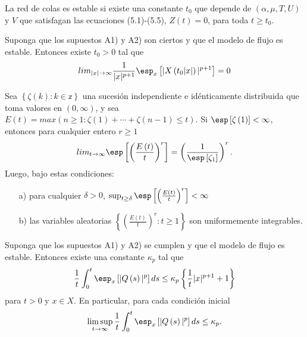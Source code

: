 \begin{Teo}\label{Tma.5.1.Chen}
La red de colas es estable si existe una constante $t_{0}$ que
depende de $\left(\alpha,\mu,T,U\right)$ y $V$ que satisfagan las
ecuaciones (5.1)-(5.5), $Z\left(t\right)=0$, para toda $t\geq
t_{0}$.
\end{Teo}

\begin{Prop}\label{Prop.5.1.DaiSean}
Suponga que los supuestos A1) y A2) son ciertos y que el modelo de flujo es estable. Entonces existe $t_{0}>0$ tal que
\begin{equation}
lim_{|x|\rightarrow\infty}\frac{1}{|x|^{p+1}}\esp_{x}\left[|X\left(t_{0}|x|\right)|^{p+1}\right]=0
\end{equation}
\end{Prop}

\begin{Lemma}\label{Lema.5.2.DaiSean}
 Sea $\left\{\zeta\left(k\right):k\in \mathbb{z}\right\}$ una sucesi\'on independiente e id\'enticamente distribuida que toma valores en $\left(0,\infty\right)$,
y sea
$E\left(t\right)=max\left(n\geq1:\zeta\left(1\right)+\cdots+\zeta\left(n-1\right)\leq
t\right)$. Si $\esp\left[\zeta\left(1\right)\right]<\infty$,
entonces para cualquier entero $r\geq1$
\begin{equation}
 lim_{t\rightarrow\infty}\esp\left[\left(\frac{E\left(t\right)}{t}\right)^{r}\right]=\left(\frac{1}{\esp\left[\zeta_{1}\right]}\right)^{r}.
\end{equation}
Luego, bajo estas condiciones:
\begin{itemize}
 \item[a)] para cualquier $\delta>0$, $\sup_{t\geq\delta}\esp\left[\left(\frac{E\left(t\right)}{t}\right)^{r}\right]<\infty$
\item[b)] las variables aleatorias
$\left\{\left(\frac{E\left(t\right)}{t}\right)^{r}:t\geq1\right\}$
son uniformemente integrables.
\end{itemize}
\end{Lemma}

\begin{Teo}\label{Tma.5.5.DaiSean}
Suponga que los supuestos A1) y A2) se cumplen y que el modelo de
flujo es estable. Entonces existe una constante $\kappa_{p}$ tal
que
\begin{equation}
\frac{1}{t}\int_{0}^{t}\esp_{x}\left[|Q\left(s\right)|^{p}\right]ds\leq\kappa_{p}\left\{\frac{1}{t}|x|^{p+1}+1\right\}
\end{equation}
para $t>0$ y $x\in X$. En particular, para cada condici\'on
inicial
\begin{eqnarray*}
\limsup_{t\rightarrow\infty}\frac{1}{t}\int_{0}^{t}\esp_{x}\left[|Q\left(s\right)|^{p}\right]ds\leq\kappa_{p}.
\end{eqnarray*}
\end{Teo}

